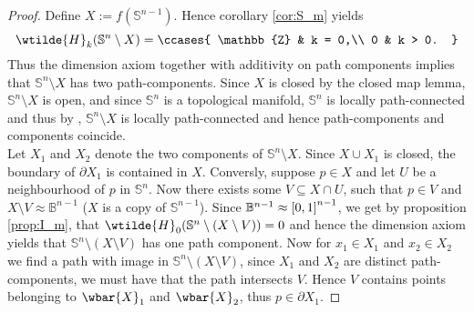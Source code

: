 \begin{proof}
	Define $X := f(\mathbb{S}^{n - 1})$. Hence corollary \ref{cor:S_m} yields
	\begin{equation*}
		\wtilde{H}_k(\mathbb{S}^n \setminus X) = \ccases{
			\mathbb{Z} & k = 0,\\
			0 & k > 0.
		}
	\end{equation*}
	Thus the dimension axiom together with additivity on path components implies that $\mathbb{S}^n \setminus X$ has two path-components. Since $X$ is closed by the closed map lemma, $\mathbb{S}^n \setminus X$ is open, and since $\mathbb{S}^n$ is a topological manifold, $\mathbb{S}^n$ is locally path-connected and thus by \cite[93]{lee:topological_manifolds:2011}, $\mathbb{S}^n \setminus X$ is locally path-connected and hence path-components and components coincide.\\
	Let $X_1$ and $X_2$ denote the two components of $\mathbb{S}^n \setminus X$. Since $X \cup X_1$ is closed, the boundary of $\partial X_1$ is contained in $X$. Conversly, suppose $p \in X$ and let $U$ be a neighbourhood of $p$ in $\mathbb{S}^n$. Now there exists some $V \subseteq X \cap U$, such that $p \in V$ and $X \setminus V \approx \mathbb{B}^{n - 1}$ ($X$ is a copy of $\mathbb{S}^{n - 1}$). Since $\mathbb{B}^{n - 1} \approx \intcc{0,1}^{n - 1}$, we get by proposition \ref{prop:I_m}, that $\wtilde{H}_0(\mathbb{S}^n \setminus (X \setminus V)) = 0$ and hence the dimension axiom yields that $\mathbb{S}^n \setminus (X \setminus V)$ has one path component. Now for $x_1 \in X_1$ and $x_2 \in X_2$ we find a path with image in $\mathbb{S}^n \setminus (X \setminus V)$, since $X_1$ and $X_2$ are distinct path-components, we must have that the path intersects $V$. Hence $V$ contains points belonging to $\wbar{X}_1$ and $\wbar{X}_2$, thus $p \in \partial X_1$.
\end{proof}
